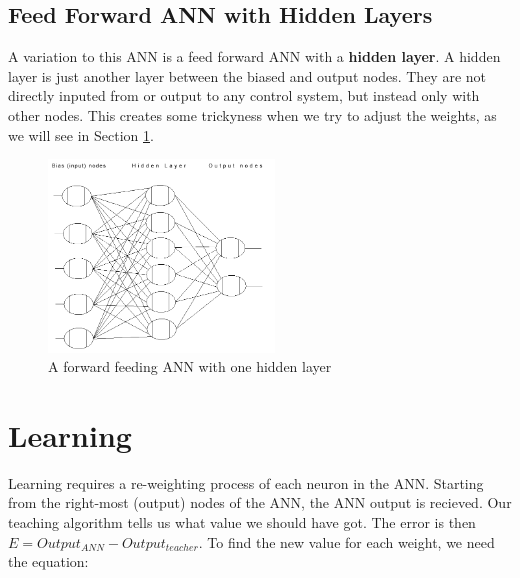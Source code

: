 \documentclass[12pt]{article}
\begin{document}
\subsection{Feed Forward ANN with Hidden Layers}

A variation to this ANN is a feed forward ANN with a \textbf{hidden layer}. A hidden layer is just another layer 
between the biased and output nodes. They are not directly inputed from or output to any control system, 
but instead only with other nodes. This creates some trickyness when we try to adjust the weights, as we 
will see in Section \ref{sec:learning}.

\pagebreak

\begin{figure}[h]
        \begin{center}
		\includegraphics[width=60mm]{report_images/feedforward_hidden01.png}
                	\caption{A forward feeding ANN with one hidden layer}
                	\label{feedforward_hidden01}
        \end{center}
\end{figure}


\section{Learning}
\label{sec:learning}
Learning requires a re-weighting process of each neuron in the ANN. Starting from the right-most (output)
nodes of the ANN, the ANN output is recieved. Our teaching algorithm tells us what value we should
have got. The error is then $ E = Output_{ANN} - Output_{teacher} $. To find the new value for each weight,
we need the equation:
\end{document}
